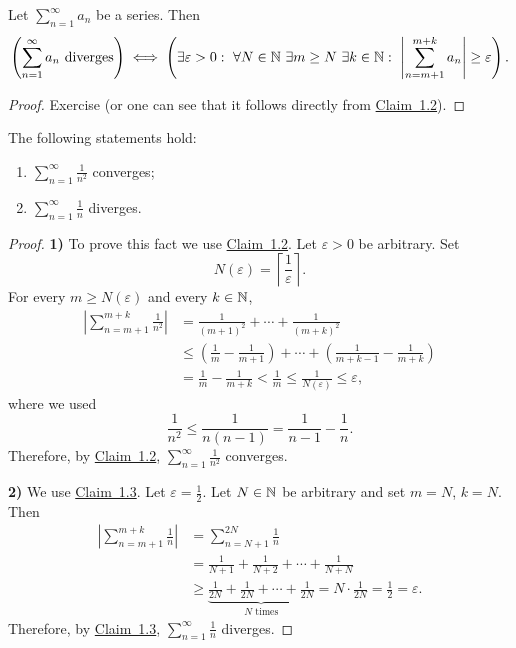 \begin{claim}\label{claim:1.3}
Let $\sum_{n=1}^{\infty}a_n$ be a series. Then
\[
\left(\sum_{n=1}^{\infty}a_n\text{ diverges}\right)
\iff
\left(
\exists\varepsilon>0:\ \forall N\in\mathbb{N}\ \exists m\ge N\ \exists k\in\mathbb{N}:\
\left|\sum_{n=m+1}^{m+k}a_n\right|\ge\varepsilon
\right).
\]
\end{claim}

\begin{proof}
Exercise (or one can see that it follows directly from \hyperref[claim:1.2]{Claim~1.2}).
\end{proof}

\begin{claim}\label{claim:1.4}
The following statements hold:
\begin{enumerate}[label=\arabic*)]
\item\label{item:claim:1.4:1} $\displaystyle \sum_{n=1}^{\infty}\frac1{n^2}$ converges;
\item\label{item:claim:1.4:2} $\displaystyle \sum_{n=1}^{\infty}\frac1n$ diverges.
\end{enumerate}
\end{claim}

\begin{proof}
\textbf{1)} To prove this fact we use \hyperref[claim:1.2]{Claim~1.2}. Let $\varepsilon>0$ be arbitrary. Set
\[
N(\varepsilon)=\left\lceil\frac1\varepsilon\right\rceil.
\]
For every $m\ge N(\varepsilon)$ and every $k\in\mathbb{N}$,
\begin{align*}
\left|\sum_{n=m+1}^{m+k}\frac1{n^2}\right|
&=\frac1{(m+1)^2}+\cdots+\frac1{(m+k)^2}\\
&\le \left(\frac1m-\frac1{m+1}\right)+\cdots+
\left(\frac1{m+k-1}-\frac1{m+k}\right)\\
&=\frac1m-\frac1{m+k}
<\frac1m
\le\frac1{N(\varepsilon)}
\le\varepsilon,
\end{align*}
where we used
\[
\frac1{n^2}\le \frac1{n(n-1)}=\frac1{n-1}-\frac1n.
\]
Therefore, by \hyperref[claim:1.2]{Claim~1.2}, $\sum_{n=1}^{\infty}\frac1{n^2}$ converges.

\medskip
\noindent\textbf{2)} We use \hyperref[claim:1.3]{Claim~1.3}. Let $\varepsilon=\frac12$. Let $N\in\mathbb{N}$ be arbitrary and set $m=N$, $k=N$. Then
\begin{align*}
\left|\sum_{n=m+1}^{m+k}\frac1n\right|
&=\sum_{n=N+1}^{2N}\frac1n\\
&=\frac1{N+1}+\frac1{N+2}+\cdots+\frac1{N+N}\\
&\ge \underbrace{\frac1{2N}+\frac1{2N}+\cdots+\frac1{2N}}_{N\text{ times}}
=N\cdot\frac1{2N}=\frac12=\varepsilon.
\end{align*}
Therefore, by \hyperref[claim:1.3]{Claim~1.3}, $\sum_{n=1}^{\infty}\frac1n$ diverges.
\end{proof}

